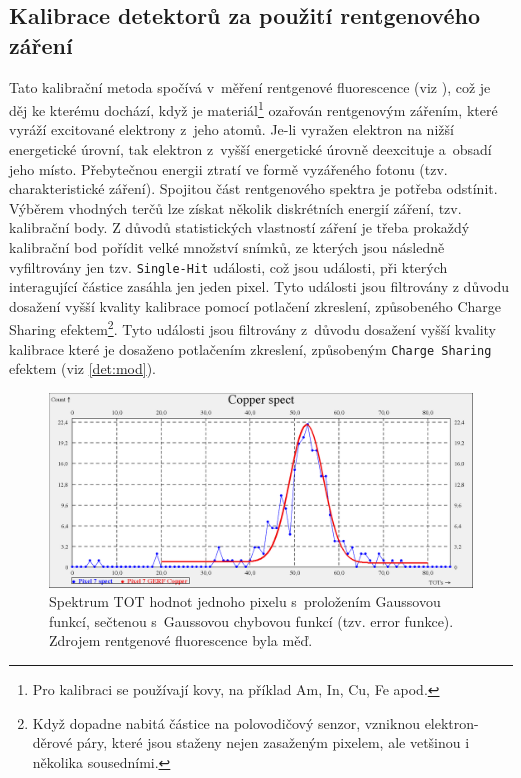 \subsection{Kalibrace detektorů za použití rentgenového záření}\label{calib:xray}
Tato kalibrační metoda \cite{Jakubek2011S262} spočívá v~měření rentgenové fluorescence (viz \cite{Jakubek-radiography_and_charge_sharing}),
což je děj ke kterému dochází, když je materiál\footnote{Pro kalibraci se používají kovy, na příklad Am, In, Cu, Fe apod.}
ozařován rentgenovým zářením, které vyráží excitované elektrony z~jeho atomů. Je-li vyražen elektron na nižší energetické úrovní, tak elektron z~vyšší energetické úrovně deexcituje a~obsadí jeho místo. 
Přebytečnou energii ztratí ve formě vyzářeného fotonu (tzv. charakteristické záření). Spojitou část rentgenového spektra je potřeba odstínit. Výběrem vhodných terčů lze získat několik diskrétních energií záření, tzv. kalibrační body. Z důvodů statistických vlastností záření je třeba prokaždý kalibrační bod pořídit velké množství snímků, ze kterých jsou následně vyfiltrovány jen tzv. \texttt{Single-Hit} události,
 což jsou události, při kterých interagující částice zasáhla jen jeden pixel. 
Tyto události jsou filtrovány z důvodu dosažení vyšší kvality kalibrace pomocí potlačení zkreslení, způsobeného Charge Sharing efektem\footnote{Když dopadne nabitá částice na polovodičový senzor, vzniknou elektron-děrové páry, které jsou staženy nejen zasaženým pixelem, ale vetšinou i několika sousedními.}.
 Tyto události jsou filtrovány z~důvodu dosažení vyšší kvality kalibrace které je dosaženo potlačením zkreslení, způsobeným \texttt{Charge Sharing} efektem (viz \ref{det:mod}).

\begin{figure}[th]
	\begin{center}
		\includegraphics[width=14cm]{figures/calib_gerf.png}
		\caption{Spektrum TOT hodnot jednoho pixelu s~proložením Gaussovou funkcí, sečtenou s~Gaussovou chybovou funkcí (tzv. error funkce). Zdrojem rentgenové fluorescence byla měď.}
		\label{fig:calib:gerf}
	\end{center}
\end{figure}

